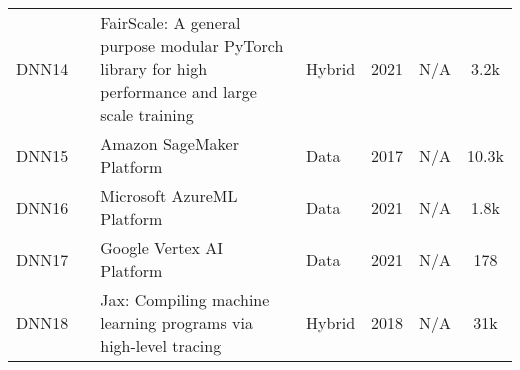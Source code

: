 \begin{table*}[th!]
\begin{tabular}{llp{8.4cm}lllc}
		\small DNN14       & \small \cite{noauthor_fairscale_nodate} & \small FairScale:  A general purpose modular PyTorch library for high performance and large scale training                          & \small Hybrid        & \small 2021          & \small N/A                & \small 3.2k \cite{FairScale2021}                                     \\[1ex]
		\small DNN15       & \small \cite{noauthor_amazon_nodate}    & \small Amazon SageMaker Platform                                                                                                    & \small Data          & \small 2017          & \small N/A                & \small 10.3k \cite{noauthor_awsamazon-sagemaker-examples_2025}       \\[1ex]
		\small DNN16       & \small \cite{sdgilley_azure_nodate}     & \small Microsoft AzureML Platform                                                                                                   & \small Data          & \small 2021          & \small N/A                & \small 1.8k \cite{noauthor_azureazureml-examples_2025}               \\[1ex]
		\small DNN17       & \small \cite{noauthor_vertex_nodate}    & \small Google Vertex AI Platform                                                                                                    & \small Data          & \small 2021          & \small N/A                & \small 178 \cite{noauthor_googlecloudplatformvertex-ai-samples_2025} \\[1ex]
		\small DNN18       & \small \cite{frostig_compiling_nodate}  & \small Jax: Compiling machine learning programs via high-level tracing                                                              & \small Hybrid        & \small 2018          & \small N/A                & \small 31k \cite{noauthor_jax-mljax_2025}                            \\[1ex]
		\hline
	\end{tabular}
\end{table*}
